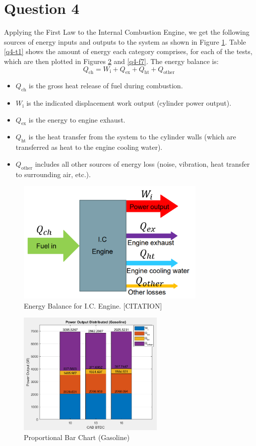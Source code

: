 \documentclass[11pt]{article}
\begin{document}
\section{Question 4}
Applying the First Law to the Internal Combustion Engine, we get the following sources of energy inputs and outputs to the system as shown in Figure \ref{q4-f1}. Table \ref{q4-t1} shows the amount of energy each category comprises, for each of the tests, which are then plotted in Figures \ref{q4-f6} and \ref{q4-f7}. The energy balance is:
\begin{equation}
	Q_\textrm{ch} = W_\textrm{i} + Q_\textrm{ex} + Q_\textrm{ht} + Q_\textrm{other}\label{q4-1}
\end{equation}
\begin{itemize}
	\item $Q_\textrm{ch}$ is the gross heat release of fuel during combustion.
	\item $W_\textrm{i}$ is the indicated displacement work output (cylinder power output).
	\item $Q_\textrm{ex}$ is the energy to engine exhaust.
	\item $Q_\textrm{ht}$ is the heat transfer from the system to the cylinder walls (which are transferred as heat to the engine cooling water).
	\item $Q_\textrm{other}$ includes all other sources of energy loss (noise, vibration, heat transfer to surrounding air, etc.).
\end{itemize}
\begin{figure}[H]
	\centering
    \includegraphics[height = 6cm]{./img/diagram16.png}
    \caption{Energy Balance for I.C. Engine. [CITATION]}
    \label{q4-f1}
\end{figure}
\begin{figure}[H]
	\centering
    \includegraphics[height = 6cm]{./img/diagram21.png}
    \caption{Proportional Bar Chart (Gasoline)}
    \label{q4-f6}
\end{figure}
\end{document}
